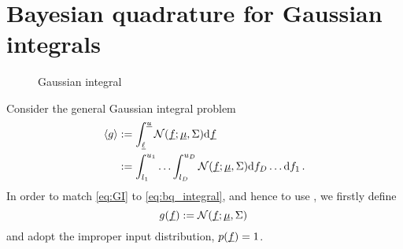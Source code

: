 \documentclass[twoside]{article}
\begin{document}
\section{Bayesian quadrature for Gaussian integrals}

\begin{figure}
\caption{Gaussian integral}
\end{figure}


Consider the general Gaussian integral problem
\begin{align}\label{eq:GI}
\langle g \rangle & := \int_{\underline{\smash{\ell}}}^{\underline{\smash{u}}} \mathcal{N}(\underline{\smash{f}};\underline{\smash{\mu}},\Sigma) \mathrm{d} \underline{\smash{f}}\nonumber\\
& := \int_{l_1}^{u_1}\ldots\int_{l_D}^{u_D} \mathcal{N}(\underline{\smash{f}};\underline{\smash{\mu}},\Sigma) \mathrm{d} f_D \ldots \mathrm{d} f_1\,.
\end{align}
In order to match \eqref{eq:GI} to \eqref{eq:bq_integral}, and hence to use \bq, we firstly define 
\begin{equation}
 g(\underline{\smash{f}}) := \mathcal{N}(\underline{\smash{f}};\underline{\smash{\mu}},\Sigma)\,
\end{equation}
and adopt the improper input distribution, $p(\underline{\smash{f}}) = 1$. 
\end{document}
